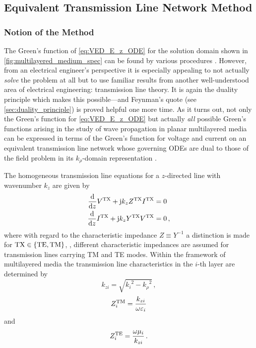 \subsection{Equivalent Transmission Line Network Method}
\label{subsec:network_method}




\subsubsection{Notion of the Method}

The Green's function of \eqref{eq:VED_E_z_ODE} for the solution domain shown
in \cref{fig:multilayered_medium_spec} can be found by various
procedures \cite{Sommerfeld1964,Chew1999}.
However, from an electrical engineer's perspective it is especially appealing to
not actually \emph{solve} the problem at all but to use familiar results from 
another well-understood area of electrical engineering:
transmission line theory.
It is again the duality principle which makes this possible---and
Feynman's quote (see \cref{sec:duality_principle}) is proved helpful one more
time.
As it turns out, not only the Green's function for \eqref{eq:VED_E_z_ODE} but
actually \emph{all} possible Green's functions arising in the study of
wave propagation in planar multilayered media can be expressed in terms of the
Green's function for voltage and current on an equivalent transmission line
network whose governing \acp{ODE} are dual to those of the field problem in its
$k_\rho$-domain representation \cite{Felsen1994,Michalski2005,Michalski2016b}.

The homogeneous transmission line equations for a $z$-directed line with
wavenumber $k_z$ are given by
\cite{Felsen1994,Michalski2016b}
\begin{subequations}\label{eq:tl_ode_system}
	\begin{align}
		\frac{\mathrm{d}}{\mathrm{d} z}
		V^{\mathrm{TX}}
		+
		\mathrm{j}
		k_z
		Z^{\mathrm{TX}}
		I^{\mathrm{TX}}
		&= 0
		\label{eq:tl_ode_system_dV}
		\\
		\frac{\mathrm{d}}{\mathrm{d} z}
		I^{\mathrm{TX}}
		+
		\mathrm{j}
		k_z
		Y^{\mathrm{TX}}
		V^{\mathrm{TX}}
		&= 0
		\label{eq:tl_ode_system_dI}
		\, ,
	\end{align}
\end{subequations}
where with regard to the characteristic impedance $Z \equiv Y^{-1}$ a
distinction is made for $\mathrm{TX} \in \left\{\mathrm{TE},\mathrm{TM}\right\}$, \ie, different
characteristic impedances are assumed for transmission lines carrying
\ac{TM} and \ac{TE} modes.
Within the framework of multilayered media the transmission line
characteristics in the $i$-th layer are determined by \cite{Michalski2016b}
\begin{equation}
	k_{zi} = \sqrt{{k_i}^2 - {k_\rho}^2}
	\, ,
\end{equation}
\begin{equation}
	Z_i^{\mathrm{TM}} = \frac{k_{zi}}{\omega \varepsilon_i}
\end{equation}
and
\begin{equation}
	Z_i^{\mathrm{TE}} = \frac{\omega \mu_i}{k_{zi}}
	\, .
\end{equation}


